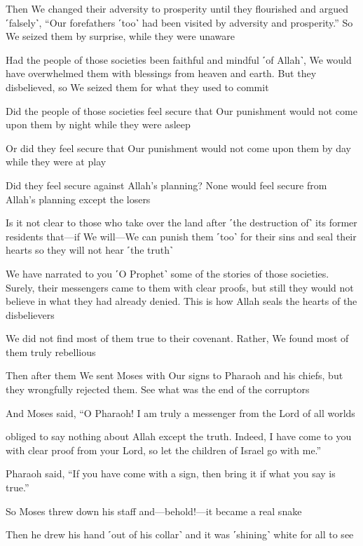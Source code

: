 Then We changed their adversity to prosperity until they flourished and argued ˹falsely˺, “Our forefathers ˹too˺ had been visited by adversity and prosperity.” So We seized them by surprise, while they were unaware

Had the people of those societies been faithful and mindful ˹of Allah˺, We would have overwhelmed them with blessings from heaven and earth. But they disbelieved, so We seized them for what they used to commit

Did the people of those societies feel secure that Our punishment would not come upon them by night while they were asleep

Or did they feel secure that Our punishment would not come upon them by day while they were at play

Did they feel secure against Allah’s planning? None would feel secure from Allah’s planning except the losers

Is it not clear to those who take over the land after ˹the destruction of˺ its former residents that—if We will—We can punish them ˹too˺ for their sins and seal their hearts so they will not hear ˹the truth˺

We have narrated to you ˹O Prophet˺ some of the stories of those societies. Surely, their messengers came to them with clear proofs, but still they would not believe in what they had already denied. This is how Allah seals the hearts of the disbelievers

We did not find most of them true to their covenant. Rather, We found most of them truly rebellious

Then after them We sent Moses with Our signs to Pharaoh and his chiefs, but they wrongfully rejected them. See what was the end of the corruptors

And Moses said, “O Pharaoh! I am truly a messenger from the Lord of all worlds

obliged to say nothing about Allah except the truth. Indeed, I have come to you with clear proof from your Lord, so let the children of Israel go with me.”

Pharaoh said, “If you have come with a sign, then bring it if what you say is true.”

So Moses threw down his staff and—behold!—it became a real snake

Then he drew his hand ˹out of his collar˺ and it was ˹shining˺ white for all to see

